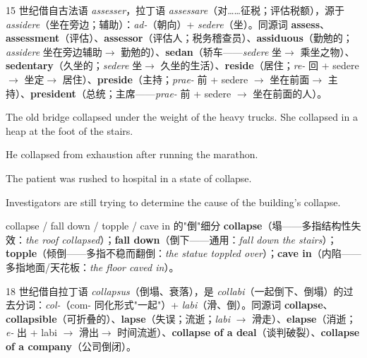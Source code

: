 \documentclass[../main.tex]{subfiles}
\begin{document}
\begin{origin}
15 世纪借自古法语 \textit{assesser}，拉丁语 \textit{assessare}（对……征税；评估税额），源于 \textit{assidere}（坐在旁边；辅助）：\textit{ad-}（朝向）+ \textit{sedere}（坐）。同源词 \textbf{assess}、\textbf{assessment}（评估）、\textbf{assessor}（评估人；税务稽查员）、\textbf{assiduous}（勤勉的；\textit{assidere} 坐在旁边辅助$\to$ 勤勉的）、\textbf{sedan}（轿车——\textit{sedere} 坐$\to$ 乘坐之物）、\textbf{sedentary}（久坐的；\textit{sedere} 坐$\to$ 久坐的生活）、\textbf{reside}（居住；\textit{re-} 回 + sedere $\to$ 坐定$\to$ 居住）、\textbf{preside}（主持；\textit{prae-} 前 + sedere $\to$ 坐在前面$\to$ 主持）、\textbf{president}（总统；主席——\textit{prae-} 前 + sedere $\to$ 坐在前面的人）。
\end{origin}


{The old bridge collapsed under the weight of the heavy trucks.}
{She collapsed in a heap at the foot of the stairs.}

{He collapsed from exhaustion after running the marathon.}

{The patient was rushed to hospital in a state of collapse.}

{Investigators are still trying to determine the cause of the building's collapse.}

\begin{gram}{collapse / fall down / topple / cave in 的"倒"细分}
\textbf{collapse}（塌——多指结构性失效：\textit{the roof collapsed}）；\textbf{fall down}（倒下——通用：\textit{fall down the stairs}）；\textbf{topple}（倾倒——多指不稳而翻倒：\textit{the statue toppled over}）；\textbf{cave in}（内陷——多指地面/天花板：\textit{the floor caved in}）。
\end{gram}

\begin{origin}
18 世纪借自拉丁语 \textit{collapsus}（倒塌、衰落），是 \textit{collabi}（一起倒下、倒塌）的过去分词：\textit{col-}（com- 同化形式"一起"）+ \textit{labi}（滑、倒）。同源词 \textbf{collapse}、\textbf{collapsible}（可折叠的）、\textbf{lapse}（失误；流逝；\textit{labi} $\to$ 滑走）、\textbf{elapse}（消逝；\textit{e-} 出 + labi $\to$ 滑出$\to$ 时间流逝）、\textbf{collapse of a deal}（谈判破裂）、\textbf{collapse of a company}（公司倒闭）。
\end{origin}
\end{document}
